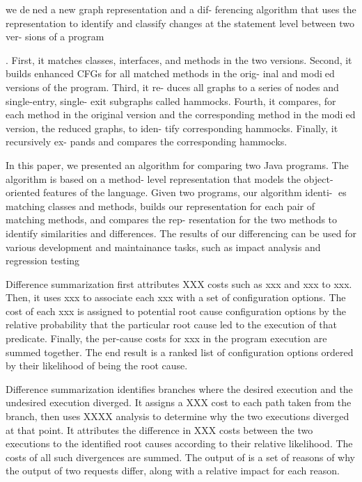we dened a new graph representation and a dif-
ferencing algorithm that uses the representation to identify
and classify changes at the statement level between two ver-
sions of a program


. First, it matches classes,
interfaces, and methods in the two versions. Second, it
builds enhanced CFGs for all matched methods in the orig-
inal and modied versions of the program. Third, it re-
duces all graphs to a series of nodes and single-entry, single-
exit subgraphs called hammocks. Fourth, it compares, for
each method in the original version and the corresponding
method in the modied version, the reduced graphs, to iden-
tify corresponding hammocks. Finally, it recursively ex-
pands and compares the corresponding hammocks.

In this paper, we presented an algorithm for comparing
two Java programs. The algorithm is based on a method-
level representation that models the object-oriented features
of the language. Given two programs, our algorithm identi-
es matching classes and methods, builds our representation
for each pair of matching methods, and compares the rep-
resentation for the two methods to identify similarities and
differences. The results of our differencing can be used for
various development and maintainance tasks, such as impact
analysis and regression testing




Difference summarization first attributes XXX costs
such as xxx and xxx to xxx. Then, it uses xxx to
associate each xxx with a set of configuration options.
The cost of each xxx is assigned to potential
root cause configuration options by the relative
probability that the particular root cause
led to the execution of that predicate. Finally,
the per-cause costs for xxx in the program execution are
summed together. The end result is a ranked
list of configuration options ordered by
their likelihood of being the root cause.

Difference summarization identifies branches where the
desired execution and the undesired execution diverged.
It assigns a XXX cost to each path taken from the branch,
then uses XXXX analysis to determine why the
two executions diverged at that point. It attributes
the difference in XXX costs between the
two executions to the identified root causes according to their
relative likelihood. The costs of all such divergences are
summed. The output of \ourtool is a set of reasons of why
the output of two requests differ, along with a
relative impact for each reason.


